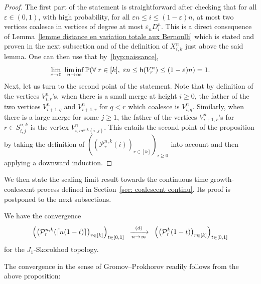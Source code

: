 \documentclass[10pt]{amsart}
\theoremstyle{definition}\newtheorem{defi}[theo]{Definition}\newtheorem{rema}[theo]{Remark}\newtheorem{exam}[theo]{Example}\newtheorem{exem}[theo]{Example}\newtheorem{nota}[theo]{Notation}
\newcommand{\e}{\varepsilon}
\newcommand{\cvloi}[1][n]{\enskip\xrightarrow[#1 \to \infty]{(d)}\enskip}
\renewcommand{\P}{{\mathbb{P}}}
\newcommand{\1}{\mathbbm{1}}
\newcommand{\Part}{\mathcal{P}}
\newcommand{\h}{\mathsf{h}}
\let\originalleft\left
\let\originalright\right
\renewcommand{\left}{\mathopen{}\mathclose\bgroup\originalleft}
\renewcommand{\right}{\aftergroup\egroup\originalright}
\renewcommand*{\to}{\mathchoice{\longrightarrow}{\rightarrow}{\rightarrow}{\rightarrow}}
\let\oldforall\forall
\renewcommand*{\forall}{\mathrel{\oldforall}}
\begin{document}
\begin{proof}
The first part of the statement is straightforward after checking that for all $\e\in (0,1)$, with high probability, for all $\e n \le i \le (1-\e) n$, at most two vertices coalesce in vertices of degree at most $\e_n D^n_i$. This is a direct consequence of Lemma~\ref{lemme distance en variation totale aux Bernoulli} which is stated and proven in the next subsection and of the definition of $X^n_{i,k}$ just above the said lemma. One can then use that by~\ref{hyp:naissance},
\[
\lim_{\e \to 0}\; \liminf_{n\to \infty} \P\left(\forall r \in [k], \; \e n \le \h(V^n_r) \le (1-\e) n \right) =1.
\]
Next, let us turn to the second point of the statement. Note that by definition of the vertices $V^n_{i,r}$'s, when there is a small merge at height $i\ge 0$, the father of the two vertices $V^n_{i+1,q}$ and $V^n_{i+1,r}$ for $q<r$ which coalesce is $V^n_{i,q}$. Similarly, when there is a large merge for some $j\ge 1$, the father of the vertices $V^n_{i+1, r}$'s for $r \in S^{n,k}_{i,j}$ is the vertex $V^n_{i, m^{n,k}(i,j)}$. This entails the second point of the proposition by taking the definition of $((\Part^{n,k}_r(i))_{r \in [k]})_{i\ge 0}$ into account and then applying a downward induction. 
\end{proof}

We then state the scaling limit result towards the continuous time growth-coalescent process defined in Section~\ref{sec: coalescent continu}. Its proof is postponed to the next subsections.

\begin{prop}\label{prop: cv coalescent Skorokhod}
We have the convergence
\[
\left(\left(\Part^{n,k}_r(\lceil n(1-t) \rceil\right)_{r \in [k]}\right)_{t\in [0,1]}
\cvloi[n]
\left(\left(\Part^k_r(1-t)\right)_{r \in [k]}\right)_{t \in [0,1]}
\]
for the $J_1$-Skorokhod topology.
\end{prop}

The convergence in the sense of Gromov--Prokhorov readily follows from the above proposition:
\end{document}
